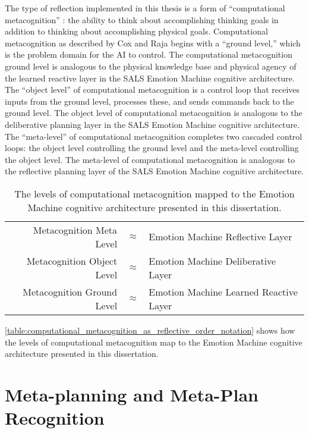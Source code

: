 The type of reflection implemented in this thesis is a form of
``computational metacognition'' \cite[]{cox_and_raja:2008,cox:2010}:
the ability to think about accomplishing thinking goals in addition to
thinking about accomplishing physical goals.  Computational
metacognition as described by Cox and Raja begins with a ``ground
level,'' which is the problem domain for the AI to control.  The
computational metacognition ground level is analogous to the physical
knowledge base and physical agency of the learned reactive layer in
the SALS Emotion Machine cognitive architecture.  The ``object level''
of computational metacognition is a control loop that receives inputs
from the ground level, processes these, and sends commands back to the
ground level.  The object level of computational metacognition is
analogous to the deliberative planning layer in the SALS Emotion
Machine cognitive architecture.  The ``meta-level'' of computational
metacognition completes two cascaded control loops: the object level
controlling the ground level and the meta-level controlling the object
level.  The meta-level of computational metacognition is analogous to
the reflective planning layer of the SALS Emotion Machine cognitive
architecture.
\begin{table}
\begin{tabular}{|rll|}
\hline
Metacognition Meta Level   &${\approx}$ &Emotion Machine Reflective Layer \\
Metacognition Object Level &${\approx}$ &Emotion Machine Deliberative Layer \\
Metacognition Ground Level &${\approx}$ &Emotion Machine Learned Reactive Layer \\
\hline
\end{tabular}
\caption{The levels of computational metacognition mapped to the
  Emotion Machine cognitive architecture presented in this
  dissertation.}
\label{table:computational_metacognition_as_reflective_order_notation}
\end{table}
\autoref{table:computational_metacognition_as_reflective_order_notation}
shows how the levels of computational metacognition map to the Emotion
Machine cognitive architecture presented in this dissertation.

\section{Meta-planning and Meta-Plan Recognition}

